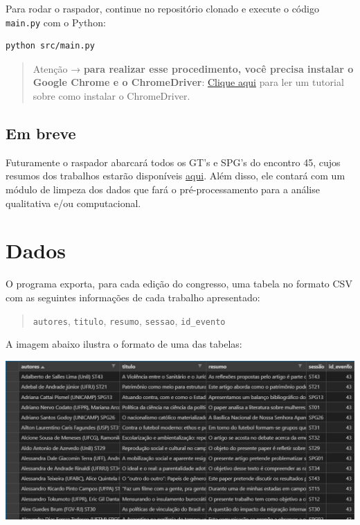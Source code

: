 \documentclass[
]{book}
\begin{document}
Para rodar o raspador, continue no repositório clonado e execute o código \texttt{main.py} com o Python:

\begin{verbatim}
python src/main.py
\end{verbatim}

\begin{quote}
Atenção → \textbf{para realizar esse procedimento, você precisa instalar o Google Chrome e o ChromeDriver}: \href{https://chromedriver.chromium.org/getting-started}{Clique aqui} para ler um tutorial sobre como instalar o ChromeDriver.
\end{quote}

\hypertarget{em-breve}{%
\subsection{Em breve}\label{em-breve}}

Futuramente o raspador abarcará todos os GT's e SPG's do encontro 45, cujos resumos dos trabalhos estarão disponíveis \href{https://www.anpocs2021.sinteseeventos.com.br/}{aqui}. Além disso, ele contará com um módulo de limpeza dos dados que fará o pré-processamento para a análise qualitativa e/ou computacional.

\hypertarget{dados-2}{%
\section{Dados}\label{dados-2}}

O programa exporta, para cada edição do congresso, uma tabela no formato CSV com as seguintes informações de cada trabalho apresentado:

\begin{quote}
\texttt{autores}, \texttt{titulo}, \texttt{resumo}, \texttt{sessao}, \texttt{id\_evento}
\end{quote}

A imagem abaixo ilustra o formato de uma das tabelas:

\includegraphics{img/anpocs_scraper_csv.png}
\end{document}
